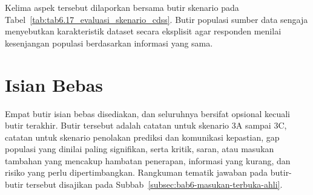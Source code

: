 Kelima aspek tersebut dilaporkan bersama butir skenario pada Tabel~\ref{tab:tab6.17_evaluasi_skenario_cdss}. Butir populasi sumber data sengaja menyebutkan
karakteristik dataset secara eksplisit agar responden menilai kesenjangan populasi berdasarkan informasi yang sama.

\section{Isian Bebas}
\label{lamp:instrumen-bebas}

Empat butir isian bebas disediakan, dan seluruhnya bersifat opsional kecuali butir terakhir. Butir tersebut adalah catatan untuk skenario 3A sampai 3C, catatan
untuk skenario penolakan prediksi dan komunikasi kepastian, gap populasi yang dinilai paling signifikan, serta kritik, saran, atau masukan tambahan yang mencakup
hambatan penerapan, informasi yang kurang, dan risiko yang perlu dipertimbangkan. Rangkuman tematik jawaban pada butir-butir tersebut disajikan pada
Subbab~\ref{subsec:bab6-masukan-terbuka-ahli}.
